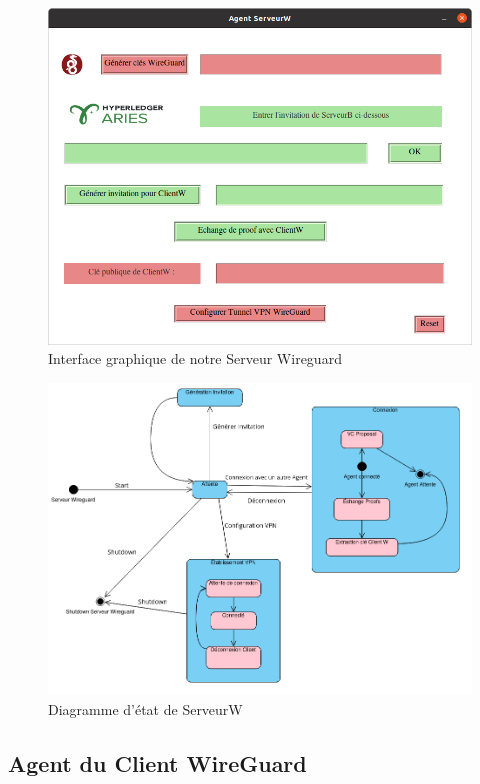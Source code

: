 \documentclass[12pt, openany]{report}
\begin{document}
\begin{flushleft}
\begin{figure}[H]
\includegraphics[scale=0.5]{serveurW.png}
\centering
\caption{Interface graphique de notre Serveur Wireguard}
\end{figure}

\begin{figure}[H]
\includegraphics[scale=0.5]{EtatServeurW.png}
\centering
\caption{Diagramme d'état de ServeurW}
\end{figure}
\end{flushleft}

\subsection{Agent du Client WireGuard}
\end{document}

